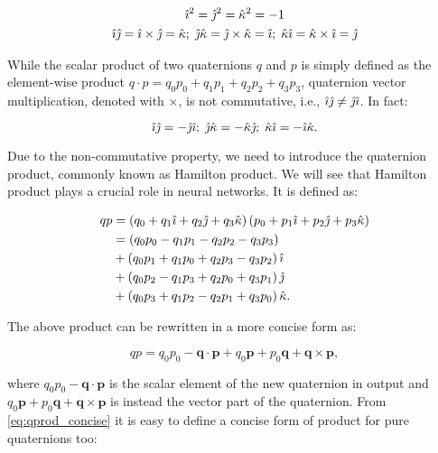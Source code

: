 \documentclass[graybox]{svmult}
\begin{document}
\begin{gather}
    {\hat{\imath}}^2 = {\hat{\jmath}}^2 = {\hat{\kappa}}^2 = -1 \\
    {\hat{\imath}} {\hat{\jmath}} = {\hat{\imath}} \times {\hat{\jmath}} = {\hat{\kappa}} ; \; {\hat{\jmath}} {\hat{\kappa}} = {\hat{\jmath}} \times {\hat{\kappa}} = {\hat{\imath}} ; \; {\hat{\kappa}} {\hat{\imath}} = {\hat{\kappa}} \times {\hat{\imath}} = {\hat{\jmath}}
\end{gather}

While the scalar product of two quaternions $q$ and $p$ is simply defined as the element-wise product $q \cdot p = q_0p_0 + q_1p_1 + q_2p_2 + q_3p_3$, quaternion vector multiplication, denoted with $ \times $, is not commutative, i.e., ${\hat{\imath}} {\hat{\jmath}} \neq {\hat{\jmath}} {\hat{\imath}}$. In fact:

\begin{equation*}
    {\hat{\imath}} {\hat{\jmath}} = - {\hat{\jmath}} {\hat{\imath}} ; \; {\hat{\jmath}} {\hat{\kappa}} = - {\hat{\kappa}} {\hat{\jmath}} ; \; {\hat{\kappa}} {\hat{\imath}} = - {\hat{\imath}} {\hat{\kappa}}.
\end{equation*}

Due to the non-commutative property, we need to introduce the quaternion product, commonly known as Hamilton product. We will see that Hamilton product plays a crucial role in neural networks. It is defined as:

\begin{equation}
	\begin{split}
		qp &= \left(q_0 + q_1{\hat{\imath}} + q_2{\hat{\jmath}} + q_3{\hat{\kappa}}\right)\left(p_0 + p_1{\hat{\imath}} + p_2{\hat{\jmath}} + p_3{\hat{\kappa}}\right) \\
		&= \left(q_0 p_0 - q_1 p_1 - q_2 p_2 - q_3 p_3\right) \\
		&+ \left(q_0 p_1 + q_1 p_0 + q_2 p_3 - q_3 p_2\right){\hat{\imath}} \\
		&+ \left(q_0 p_2 - q_1 p_3 + q_2 p_0 + q_3 p_1\right){\hat{\jmath}} \\
		&+ \left(q_0 p_3 + q_1 p_2 - q_2 p_1 + q_3 p_0\right){\hat{\kappa}}. 
	\end{split}
	\label{eq:qprod}
\end{equation}

The above product can be rewritten in a more concise form as:

\begin{equation}
\label{eq:qprod_concise}
    qp = q_0 p_0 - \mathbf{q} \cdot \mathbf{p} + q_0 \mathbf{p} + p_0 \mathbf{q} + \mathbf{q} \times \mathbf{p},
\end{equation}

\noindent where $q_0 p_0 - \mathbf{q} \cdot \mathbf{p}$ is the scalar element of the new quaternion in output and $q_0 \mathbf{p} + p_0 \mathbf{q} + \mathbf{q} \times \mathbf{p}$ is instead the vector part of the quaternion. From \eqref{eq:qprod_concise} it is easy to define a concise form of product for pure quaternions too:
\end{document}
